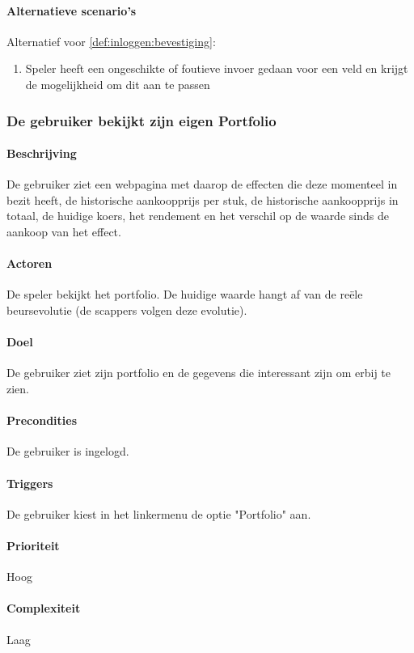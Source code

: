 \paragraph{Alternatieve scenario’s}
Alternatief voor \ref{def:inloggen:bevestiging}:
\begin{enumerate}
 \item Speler heeft een ongeschikte of foutieve invoer gedaan voor een veld en krijgt de mogelijkheid om dit aan te passen
\end{enumerate}

\subsubsection{De gebruiker bekijkt zijn eigen Portfolio}
\paragraph{Beschrijving} De gebruiker ziet een webpagina met daarop de effecten die deze momenteel in bezit heeft, de historische aankoopprijs per stuk, de historische aankoopprijs in totaal, de huidige koers, het rendement en het verschil op de waarde sinds de aankoop van het effect.
\paragraph{Actoren} De speler bekijkt het portfolio. De huidige waarde hangt af van de reële beursevolutie (de scappers volgen deze evolutie).
\paragraph{Doel} De gebruiker ziet zijn portfolio en de gegevens die interessant zijn om erbij te zien.
\paragraph{Precondities} De gebruiker is ingelogd.
\paragraph{Triggers} De gebruiker kiest in het linkermenu de optie "Portfolio" aan.
\paragraph{Prioriteit}Hoog
\paragraph{Complexiteit}Laag
